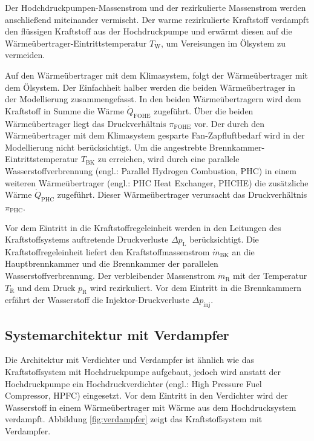 Der Hodchdruckpumpen-Massenstrom und der rezirkulierte Massenstrom werden anschließend miteinander vermischt. Der warme rezirkulierte Kraftstoff verdampft den flüssigen Kraftstoff aus der Hochdruckpumpe und erwärmt diesen auf die Wärmeübertrager-Eintrittstemperatur $T_\mathrm{W}$, um Vereisungen im Ölsystem zu vermeiden.

Auf den Wärmeübertrager mit dem Klimasystem, folgt der Wärmeübertrager mit dem Ölsystem. Der Einfachheit halber werden die beiden Wärmeübertrager in der Modellierung zusammengefasst. In den beiden Wärmeübertragern wird dem Kraftstoff in Summe die Wärme $\dot{Q}_{\mathrm{FOHE}}$ zugeführt. Über die beiden Wärmeübertrager liegt das Druckverhältnis $\pi_{\mathrm{FOHE}}$ vor. Der durch den Wärmeübertrager mit dem Klimasystem gesparte Fan-Zapfluftbedarf wird in der Modellierung nicht berücksichtigt. Um die angestrebte Brennkammer-Eintrittstemperatur $T_{\mathrm{BK}}$ zu erreichen, wird durch eine parallele Wasserstoffverbrennung (engl.: Parallel Hydrogen Combustion, PHC) in einem weiteren Wärmeübertrager (engl.: PHC Heat Exchanger, PHCHE) die zusätzliche Wärme $\dot{Q}_{\mathrm{PHC}}$ zugeführt. Dieser Wärmeübertrager verursacht das Druckverhältnis $\pi_{\mathrm{PHC}}$. 

Vor dem Eintritt in die Kraftstoffregeleinheit werden in den Leitungen des Kraftstoffsystems auftretende Druckverluste $\Delta p_\mathrm{L}$  berücksichtigt. Die Kraftstoffregeleinheit liefert den Kraftstoffmassenstrom $\dot{m}_{\mathrm{BK}}$ an die Hauptbrennkammer und die Brennkammer der parallelen Wasserstoffverbrennung. Der verbleibender Massenstrom $\dot{m}_\mathrm{R}$ mit der Temperatur $T_\mathrm{R}$ und dem Druck $p_\mathrm{R}$ wird rezirkuliert. Vor dem Eintritt in die Brennkammern erfährt der Wasserstoff die Injektor-Druckverluste $\Delta p_{\mathrm{inj}}$. 

\subsection{Systemarchitektur mit Verdampfer}

Die Architektur mit Verdichter und Verdampfer ist ähnlich wie das Kraftstoffsystem mit Hochdruckpumpe aufgebaut, jedoch wird anstatt der Hochdruckpumpe ein Hochdruckverdichter (engl.: High Pressure Fuel Compressor, HPFC) eingesetzt. Vor dem Eintritt in den Verdichter wird der Wasserstoff in einem Wärmeübertrager mit Wärme aus dem Hochdrucksystem verdampft. Abbildung \ref{fig:verdampfer} zeigt das Kraftstoffsystem mit Verdampfer.

